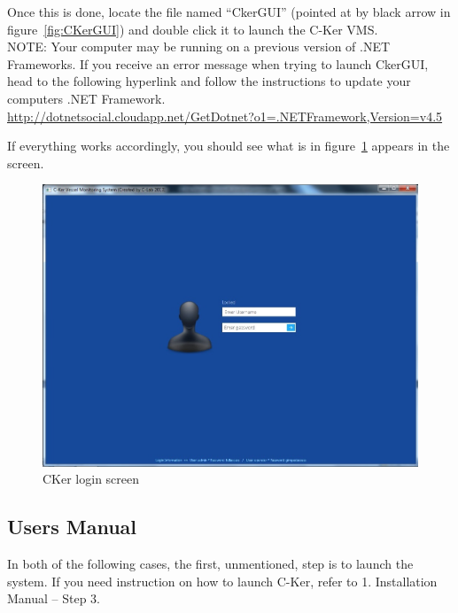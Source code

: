 \documentclass[12pt]{article}
\begin{document}
Once this is done, locate the file named “CkerGUI” (pointed at by black arrow in figure~\ref{fig:CKerGUI}) and double click it to launch the C-Ker VMS.\\

{NOTE: Your computer may be running on a previous version of .NET Frameworks. If you receive an error message when trying to launch CkerGUI, head to the following hyperlink and follow the instructions to update your computers .NET Framework.}\\ 
\url{http://dotnetsocial.cloudapp.net/GetDotnet?o1=.NETFramework,Version=v4.5}\par
If everything works accordingly, you should see what is in figure~\ref{fig:CKer login screen} appears in the screen.
\begin{figure}[h!]
    \centering
    \includegraphics[scale=1]{insta9}
    \caption{CKer login screen}
    \label{fig:CKer login screen}
\end{figure}\par







\subsection{Users Manual}

In both of the following cases, the first, unmentioned, step is to launch the system. If you need instruction on how to launch C-Ker, refer to 1. Installation Manual – Step 3. 
\end{document}
